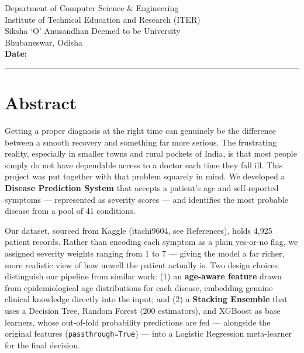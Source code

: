 \documentclass[12pt,a4paper]{article}
\begin{document}
\vfill

\begin{center}
Department of Computer Science \& Engineering\\
Institute of Technical Education and Research (ITER)\\
Siksha `O' Anusandhan Deemed to be University\\
Bhubaneswar, Odisha\\[0.5cm]

\textbf{Date:} \rule{4cm}{0.4pt}
\end{center}

\newpage

\tableofcontents
\newpage

\section{Abstract}

Getting a proper diagnosis at the right time can genuinely be the difference between a smooth recovery and something far more serious. The frustrating reality, especially in smaller towns and rural pockets of India, is that most people simply do not have dependable access to a doctor each time they fall ill. This project was put together with that problem squarely in mind. We developed a \textbf{Disease Prediction System} that accepts a patient's age and self-reported symptoms --- represented as severity scores --- and identifies the most probable disease from a pool of 41 conditions.

Our dataset, sourced from Kaggle (itachi9604, see References), holds 4,925 patient records. Rather than encoding each symptom as a plain yes-or-no flag, we assigned severity weights ranging from 1 to 7 --- giving the model a far richer, more realistic view of how unwell the patient actually is. Two design choices distinguish our pipeline from similar work: (1) an \textbf{age-aware feature} drawn from epidemiological age distributions for each disease, embedding genuine clinical knowledge directly into the input; and (2) a \textbf{Stacking Ensemble} that uses a Decision Tree, Random Forest (200 estimators), and XGBoost as base learners, whose out-of-fold probability predictions are fed --- alongside the original features (\texttt{passthrough=True}) --- into a Logistic Regression meta-learner for the final decision.
\end{document}

